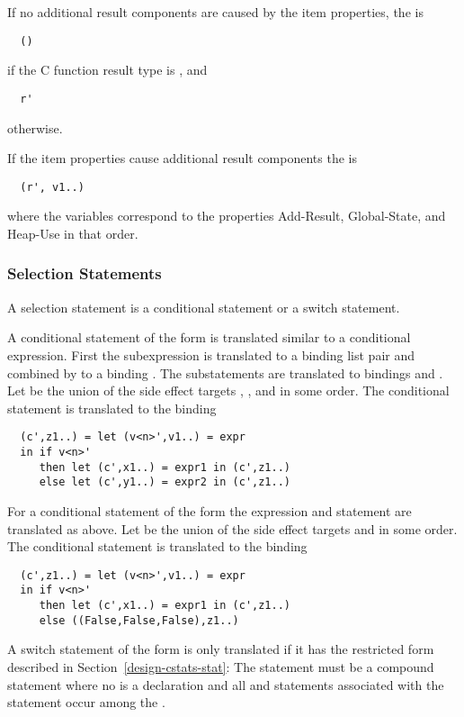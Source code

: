 If no additional result components are caused by the item properties, the  is
\begin{verbatim}
  ()
\end{verbatim}
if the C function result type is , and
\begin{verbatim}
  r'
\end{verbatim}
otherwise.

If the item properties cause additional result components the  is
\begin{verbatim}
  (r', v1..)
\end{verbatim}
where the variables  correspond to the properties Add-Result, Global-State, and Heap-Use in that order.

\subsubsection{Selection Statements}

A selection statement is a conditional statement or a switch statement.

A conditional statement of the form  is translated similar to a conditional expression.
First the subexpression  is translated to a binding list pair and combined by  to a binding 
. The substatements are translated to bindings  and . 
Let  be the union of the side effect targets , , and  in some order. The conditional
statement is translated to the binding
\begin{verbatim}
  (c',z1..) = let (v<n>',v1..) = expr
  in if v<n>' 
     then let (c',x1..) = expr1 in (c',z1..)
     else let (c',y1..) = expr2 in (c',z1..)
\end{verbatim}

For a conditional statement of the form  the expression  and statement  are translated as
above. Let  be the union of the side effect targets  and  in some order. The conditional
statement is translated to the binding
\begin{verbatim}
  (c',z1..) = let (v<n>',v1..) = expr
  in if v<n>' 
     then let (c',x1..) = expr1 in (c',z1..)
     else ((False,False,False),z1..)
\end{verbatim}

A switch statement of the form  is only translated if it has the restricted form described in 
Section~\ref{design-cstats-stat}: The statement  must be a compound statement  where no 
is a declaration and all  and  statements associated with the  statement occur among the 
. 

